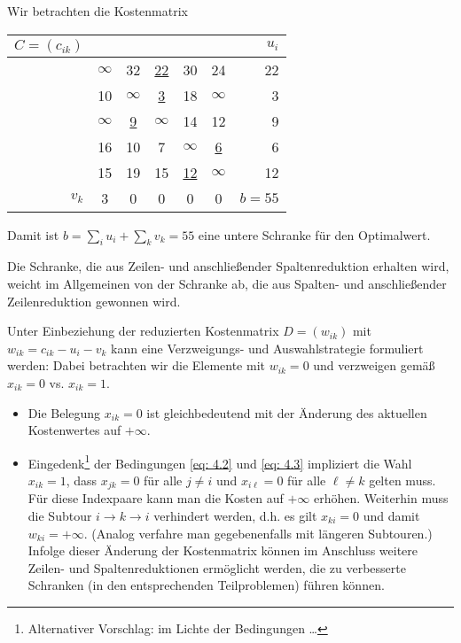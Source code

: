 \begin{beispiel} \label{beispiel: 4.3}
	Wir betrachten die Kostenmatrix
	
	\begin{center}
		\begin{tabular}{r|ccccc|r}
			$C = (c_{ik})$ &          &    &    &    &    & $u_i$ \\ \hline 
			& $\infty$ & 32 & \underline{22} & 30 & 24 & 22 \\
			& 10       & $\infty$ & \underline{3} & 18 & $\infty$ & 3\\
			& $\infty$ & \underline{9} & $\infty$ & 14 & 12 & 9\\
			& 16 & 10 & 7 & $\infty$ & \underline{6} & 6 \\
			& 15 & 19 & 15 & \underline{12} & $\infty$ & 12 \\ \hline
			$v_k$ & 3 & 0 & 0 & 0 & 0 & $b = 55$ \\ 
		\end{tabular}
	\end{center}

	Damit ist $b = \sum_i u_i + \sum_k v_k = 55$ eine untere Schranke für den Optimalwert.
\end{beispiel}

\begin{bemerkung}
	Die Schranke, die aus Zeilen- und anschließender Spaltenreduktion erhalten wird, weicht im Allgemeinen von der Schranke ab, die aus Spalten- und anschließender Zeilenreduktion gewonnen wird.
\end{bemerkung}

Unter Einbeziehung der reduzierten Kostenmatrix $D = (w_{ik})$ mit $w_{ik} = c_{ik} - u_i - v_k$ kann eine Verzweigungs- und Auswahlstrategie formuliert werden:
Dabei betrachten wir die Elemente mit $w_{ik} = 0$ und verzweigen gemäß $x_{ik} = 0$ vs. $x_{ik} = 1$.
\begin{itemize}
	\item Die Belegung $x_{ik} = 0$ ist gleichbedeutend mit der Änderung des aktuellen Kostenwertes auf $+\infty$.
	\item Eingedenk\footnote{Alternativer Vorschlag: im Lichte der Bedingungen \dots} der Bedingungen \eqref{eq: 4.2} und \eqref{eq: 4.3} impliziert die Wahl $x_{ik} = 1$, dass $x_{jk} = 0$ für alle $j \neq i$ und $x_{i\ell} = 0$ für alle $\ell \neq k$ gelten muss. Für diese Indexpaare kann man die Kosten auf $+\infty$ erhöhen. Weiterhin muss die Subtour $i \to k \to i$ verhindert werden, d.h. es gilt $x_{ki} = 0$ und damit $w_{ki} = +\infty$. (Analog verfahre man gegebenenfalls mit längeren Subtouren.)
	Infolge dieser Änderung der Kostenmatrix können im Anschluss weitere Zeilen- und Spaltenreduktionen ermöglicht werden, die zu verbesserte Schranken (in den entsprechenden Teilproblemen) führen können.
\end{itemize}

